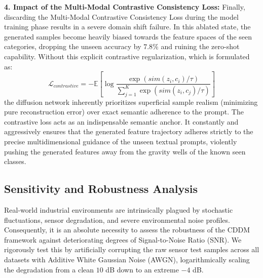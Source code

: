 \textbf{4. Impact of the Multi-Modal Contrastive Consistency Loss:}
Finally, discarding the Multi-Modal Contrastive Consistency Loss during the model training phase results in a severe domain shift failure. In this ablated state, the generated samples become heavily biased towards the feature spaces of the seen categories, dropping the unseen accuracy by $7.8\%$ and ruining the zero-shot capability. Without this explicit contrastive regularization, which is formulated as:
\begin{equation}
    \label{eq:contrastive_loss}
    \mathcal{L}_{contrastive} = - \mathbb{E} \left[ \log \frac{\exp(sim(z_i, c_i)/\tau)}{\sum_{j=1}^{K} \exp(sim(z_i, c_j)/\tau)} \right]
\end{equation}
the diffusion network inherently prioritizes superficial sample realism (minimizing pure reconstruction error) over exact semantic adherence to the prompt. The contrastive loss acts as an indispensable semantic anchor. It constantly and aggressively ensures that the generated feature trajectory adheres strictly to the precise multidimensional guidance of the unseen textual prompts, violently pushing the generated features away from the gravity wells of the known seen classes.

\subsection{Sensitivity and Robustness Analysis}

Real-world industrial environments are intrinsically plagued by stochastic fluctuations, sensor degradation, and severe environmental noise profiles. Consequently, it is an absolute necessity to assess the robustness of the CDDM framework against deteriorating degrees of Signal-to-Noise Ratio (SNR). We rigorously test this by artificially corrupting the raw sensor test samples across all datasets with Additive White Gaussian Noise (AWGN), logarithmically scaling the degradation from a clean $10$ dB down to an extreme $-4$ dB. 

